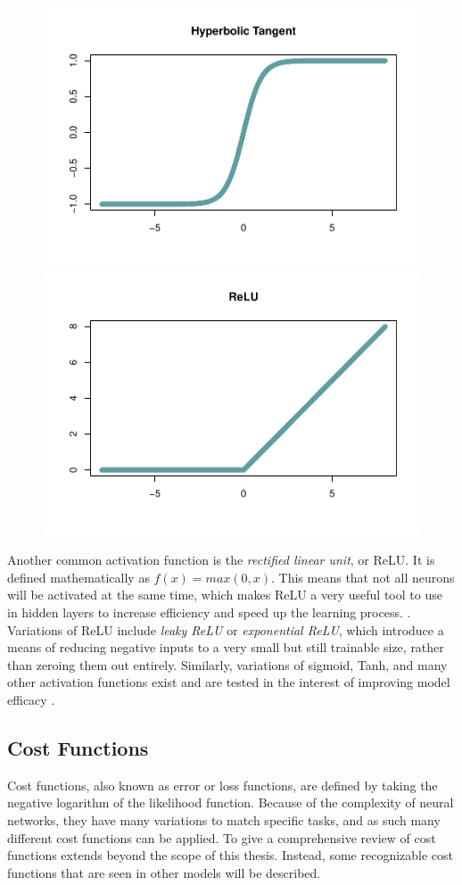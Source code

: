 \begin{figure}[H]
    \includegraphics[width=0.5\linewidth]{Figures/other-activation-functions-1.pdf}
    \includegraphics[width=0.5\linewidth]{Figures/other-activation-functions-2.pdf}
    \vspace{-40pt}
\end{figure}

Another common activation function is the \textit{rectified linear unit}, or ReLU.  It is defined mathematically as $f(x) = max(0,x)$.  This means that not all neurons will be activated at the same time, which makes ReLU a very useful tool to use in hidden layers to increase efficiency and speed up the learning process. \cite{Goodfellow-et-al-2016} \cite{sharma2017activation}. 
 Variations of ReLU include \textit{leaky ReLU} or \textit{exponential ReLU}, which introduce a means of reducing negative inputs to a very small but still trainable size, rather than zeroing them out entirely.  Similarly, variations of sigmoid, Tanh, and many other activation functions exist and are tested in the interest of improving model efficacy \cite{banerjee2019empirical}.



\hypertarget{cost-functions}{%
\subsection{Cost Functions}\label{cost-functions}}

Cost functions, also known as error or loss functions, are defined by taking the negative logarithm of the likelihood function.\cite{bishop2006pattern}  Because of the complexity of neural networks, they have many variations to match specific tasks, and as such many different cost functions can be applied.  To give a comprehensive review of cost functions extends beyond the scope of this thesis.  Instead, some recognizable cost functions that are seen in other models will be described.

